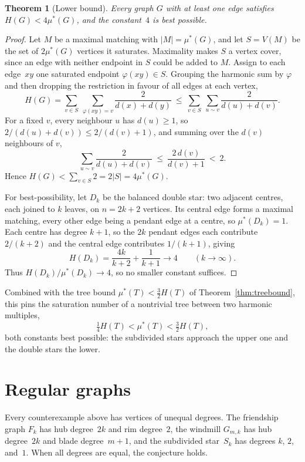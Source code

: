 \documentclass[11pt]{article}
\newtheorem{theorem}{Theorem}
\theoremstyle{definition}
\theoremstyle{remark}
\newcommand{\mustar}{\mu^{*}}
\begin{document}
\begin{theorem}[Lower bound]\label{thm:lower}
Every graph $G$ with at least one edge satisfies $H(G) < 4\mustar(G)$, and the
constant~$4$ is best possible.
\end{theorem}

\begin{proof}
Let $M$ be a maximal matching with $|M| = \mustar(G)$, and let $S = V(M)$ be the
set of $2\mustar(G)$ vertices it saturates.  Maximality makes $S$ a vertex
cover, since an edge with neither endpoint in $S$ could be added to $M$.  Assign
to each edge~$xy$ one saturated endpoint $\varphi(xy) \in S$.  Grouping the
harmonic sum by $\varphi$ and then dropping the restriction in favour of all
edges at each vertex,
\[
  H(G) = \sum_{v \in S}\ \sum_{\varphi(xy) = v} \frac{2}{d(x)+d(y)}
       \ \le\ \sum_{v \in S}\ \sum_{u \sim v} \frac{2}{d(u)+d(v)} .
\]
For a fixed $v$, every neighbour $u$ has $d(u) \ge 1$, so
$2/(d(u)+d(v)) \le 2/(d(v)+1)$, and summing over the $d(v)$ neighbours of $v$,
\[
  \sum_{u \sim v} \frac{2}{d(u)+d(v)} \ \le\ \frac{2\,d(v)}{d(v)+1} \ <\ 2 .
\]
Hence $H(G) < \sum_{v \in S} 2 = 2|S| = 4\mustar(G)$.

For best-possibility, let $D_k$ be the balanced double star: two adjacent
centres, each joined to $k$ leaves, on $n = 2k+2$ vertices.  Its central edge
forms a maximal matching, every other edge being a pendant edge at a centre, so
$\mustar(D_k) = 1$.  Each centre has degree $k+1$, so the $2k$ pendant edges
each contribute $2/(k+2)$ and the central edge contributes $1/(k+1)$, giving
\[
  H(D_k) = \frac{4k}{k+2} + \frac{1}{k+1} \longrightarrow 4
  \qquad (k \to \infty).
\]
Thus $H(D_k)/\mustar(D_k) \to 4$, so no smaller constant suffices.
\end{proof}

Combined with the tree bound $\mustar(T) < \tfrac{3}{2} H(T)$ of
Theorem~\ref{thm:treebound}, this pins the saturation number of a nontrivial
tree between two harmonic multiples,
\[
  \tfrac{1}{4} H(T) < \mustar(T) < \tfrac{3}{2} H(T),
\]
both constants best possible: the subdivided stars approach the upper one and
the double stars the lower.

\section{Regular graphs}\label{sec:regular}

Every counterexample above has vertices of unequal degrees.  The friendship
graph $F_k$ has hub degree~$2k$ and rim degree~$2$, the windmill $G_{m,k}$
has hub degree~$2k$ and blade degree~$m+1$, and the subdivided star~$S_k$
has degrees $k$, $2$, and~$1$.  When all degrees are equal, the conjecture
holds.
\end{document}
